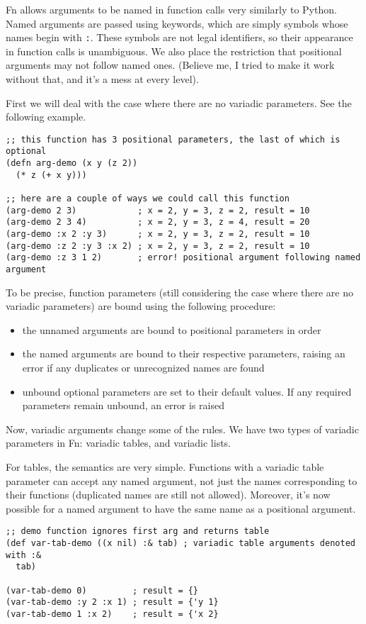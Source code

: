 \documentclass[11pt]{article}
\begin{document}
Fn allows arguments to be named in function calls very similarly to Python.
Named arguments are passed using keywords, which are simply symbols whose names
begin with \texttt{:}. These symbols are not legal identifiers, so their appearance in
function calls is unambiguous. We also place the restriction that positional
arguments may not follow named ones. (Believe me, I tried to make it work
without that, and it's a mess at every level).

First we will deal with the case where there are no variadic parameters. See the
following example.
\begin{verbatim}
;; this function has 3 positional parameters, the last of which is optional
(defn arg-demo (x y (z 2))
  (* z (+ x y)))

;; here are a couple of ways we could call this function
(arg-demo 2 3)            ; x = 2, y = 3, z = 2, result = 10
(arg-demo 2 3 4)          ; x = 2, y = 3, z = 4, result = 20
(arg-demo :x 2 :y 3)      ; x = 2, y = 3, z = 2, result = 10
(arg-demo :z 2 :y 3 :x 2) ; x = 2, y = 3, z = 2, result = 10
(arg-demo :z 3 1 2)       ; error! positional argument following named argument
\end{verbatim}

To be precise, function parameters (still considering the case where there are
no variadic parameters) are bound using the following procedure:
\begin{itemize}
\item the unnamed arguments are bound to positional parameters in order
\item the named arguments are bound to their respective parameters, raising an error
if any duplicates or unrecognized names are found
\item unbound optional parameters are set to their default values. If any required
parameters remain unbound, an error is raised
\end{itemize}

Now, variadic arguments change some of the rules. We have two types of variadic
parameters in Fn: variadic tables, and variadic lists.

For tables, the semantics are very simple. Functions with a variadic table
parameter can accept any named argument, not just the names corresponding to
their functions (duplicated names are still not allowed). Moreover, it's now
possible for a named argument to have the same name as a positional argument.
\begin{verbatim}
;; demo function ignores first arg and returns table
(def var-tab-demo ((x nil) :& tab) ; variadic table arguments denoted with :&
  tab)

(var-tab-demo 0)         ; result = {}
(var-tab-demo :y 2 :x 1) ; result = {'y 1}
(var-tab-demo 1 :x 2)    ; result = {'x 2}
\end{verbatim}
\end{document}
